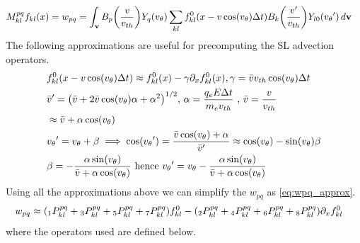 \documentclass{article}[draft]
\begin{document}
\begin{align}
	M^{pq}_{kl} f_{kl}(x) &= w_{pq} = \int_{\vect{v}} B_p\of{\frac{v}{v_{th}}} Y_q\of{\vtheta} \sum_{kl} f^{0}_{kl}\of{x-v\cos\of{\vtheta}\Delta t} B_k\of {\frac{v^\prime}{v_{th}}} Y_{l0}\of{\vtheta^\prime} \diff{\vect{v}} \label{eq:sl_advection}
\end{align}
The following approximations are useful for precomputing the SL advection operators. 
\begin{align}
&f^{0}_{kl}\of{x-v\cos\of{\vtheta}\Delta t} \approx f^{0}_{kl}(x) - \gamma \partial_x f^{0}_{kl}(x), \gamma=\bar{v} v_{th} \cos\of{\vtheta}\Delta t\\
&\bar{v}^\prime = \of{\bar{v} + 2\bar{v} \cos\of{\vtheta} \alpha + \alpha^2}^{1/2} \text{, } \alpha = \frac{q_e E \Delta t}{m_e v_{th}} \text{ , } \bar{v} = \frac{v}{v_{th}}\\
&\approx \bar{v} + \alpha \cos\of{\vtheta} \nonumber \\
&\vtheta^\prime  = \vtheta + \beta \implies \cos\of{\vtheta^\prime} = \frac{\bar{v}\cos\of{\vtheta} + \alpha}{\bar{v}^\prime} \approx \cos\of{\vtheta} - \sin\of{\vtheta} \beta \\
&\beta = -\frac{\alpha \sin\of{\vtheta}}{\bar{v} + \alpha \cos\of{\vtheta}} \text{ hence } \vtheta^\prime = \vtheta - \frac{\alpha \sin\of{\vtheta}}{\bar{v} + \alpha \cos\of{\vtheta}}
\end{align} Using all the approximations above we can simplify the $w_{pq}$ as \eqref{eq:wpq_approx}.
\begin{align}
&w_{pq} \approx \of{{}_1P^{pq}_{kl} + {}_3P^{pq}_{kl} + {}_5P^{pq}_{kl} + {}_7P^{pq}_{kl}} f^{0}_{kl} -\of{{}_2P^{pq}_{kl} + {}_4P^{pq}_{kl} + {}_6P^{pq}_{kl} + {}_8P^{pq}_{kl}} \partial_x f^{0}_{kl} \label{eq:wpq_approx}
\end{align} where the operators used are defined below. 
\end{document}
